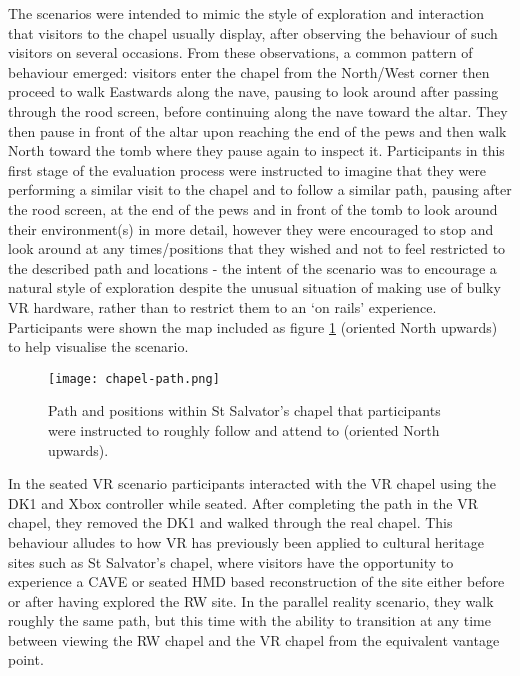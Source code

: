 The scenarios were intended to mimic the style of exploration and interaction that visitors to the chapel usually display, after observing the behaviour of such visitors on several occasions. From these observations, a common pattern of behaviour emerged: visitors enter the chapel from the North/West corner then proceed to walk Eastwards along the nave, pausing to look around after passing through the rood screen, before continuing along the nave toward the altar. They then pause in front of the altar upon reaching the end of the pews and then walk North toward the tomb where they pause again to inspect it. Participants in this first stage of the evaluation process were instructed to imagine that they were performing a similar visit to the chapel and to follow a similar path, pausing after the rood screen, at the end of the pews and in front of the tomb to look around their environment(s) in more detail, however they were encouraged to stop and look around at any times/positions that they wished and not to feel restricted to the described path and locations - the intent of the scenario was to encourage a natural style of exploration despite the unusual situation of making use of bulky VR hardware, rather than to restrict them to an `on rails' experience. Participants were shown the map included as figure \ref{chapel-path} (oriented North upwards) to help visualise the scenario.

\begin{figure}
	\begin{center}
		\texttt{[image: chapel-path.png]}
		\caption{Path and positions within St Salvator's chapel that participants were instructed to roughly follow and attend to (oriented North upwards).}
		\label{chapel-path}
	\end{center}
\end{figure}

In the seated VR scenario participants interacted with the VR chapel using the DK1 and Xbox controller while seated. After completing the path in the VR chapel, they removed the DK1 and walked through the real chapel. This behaviour alludes to how VR has previously been applied to cultural heritage sites such as St Salvator's chapel, where visitors have the opportunity to experience a CAVE or seated HMD based reconstruction of the site either before or after having explored the RW site. In the parallel reality scenario, they walk roughly the same path, but this time with the ability to transition at any time between viewing the RW chapel and the VR chapel from the equivalent vantage point.

